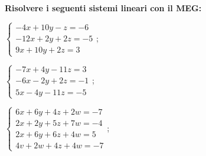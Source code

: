 \begin{exer}
    \textbf{Risolvere i seguenti sistemi lineari con il MEG:}

    $
        \begin{cases}
            -4x + 10y - z = -6 \\
            -12x + 2y + 2z = -5 \\
            9x + 10y + 2z = 3
        \end{cases}
    $;

    $
        \begin{cases}
            -7x + 4y - 11z = 3 \\
            -6x - 2y + 2z = -1 \\
            5x - 4y - 11z = -5
        \end{cases}
    $;

    $
        \begin{cases}
            6x + 6y + 4z + 2w = -7 \\
            2x + 2y + 5z + 7w = -4 \\
            2x + 6y + 6z + 4w = 5 \\
            4v + 2w + 4z + 4w = -7
        \end{cases}
    $;
\end{exer}

